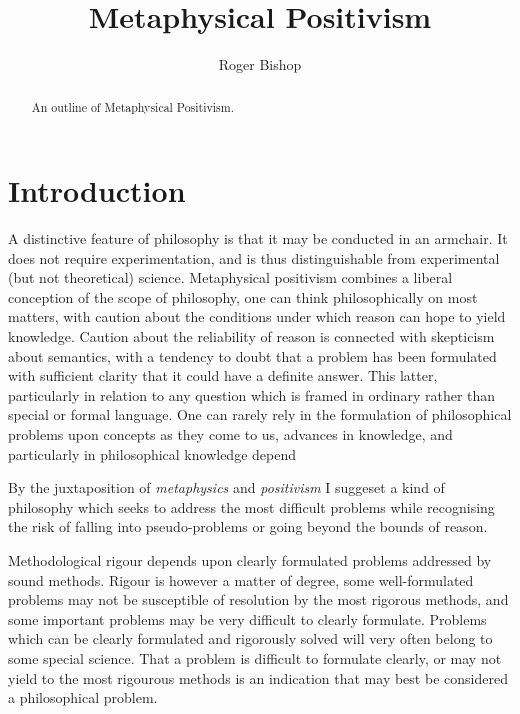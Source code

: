 \documentclass{rbjk}
\begin{document}
                                                                                   
\begin{article}
\begin{opening}  
\title{Metaphysical Positivism}
\author{Roger Bishop }

\begin{abstract}
An outline of Metaphysical Positivism.
\end{abstract}
\end{opening}

\tableofcontents

\section{Introduction}

A distinctive feature of philosophy is that it may be conducted in an armchair.
It does not require experimentation, and is thus distinguishable from experimental (but not theoretical) science.
Metaphysical positivism combines a liberal conception of the scope of philosophy, one can think philosophically on most matters, with caution about the conditions under which reason can hope to yield knowledge.
Caution about the reliability of reason is connected with skepticism about semantics, with a tendency to doubt that a problem has been formulated with sufficient clarity that it could have a definite answer.
This latter, particularly in relation to any question which is framed in ordinary rather than special or formal language.
One can rarely rely in the formulation of philosophical problems upon concepts as they come to us, advances in knowledge, and particularly in philosophical knowledge depend 

By the juxtaposition of {\it metaphysics} and {\it positivism} I suggeset a kind of philosophy which seeks to address the most difficult problems while recognising the risk of falling into pseudo-problems or going beyond the bounds of reason.

Methodological rigour depends upon clearly formulated problems addressed by sound methods.
Rigour is however a matter of degree, some well-formulated problems may not be susceptible of resolution by the most rigorous methods, and some important problems may be very difficult to clearly formulate.
Problems which can be clearly formulated and rigorously solved will very often belong to some special science.
That a problem is difficult to formulate clearly, or may not yield to the most rigourous methods is an indication that may best be considered a philosophical problem.


\end{article}
\end{document}
